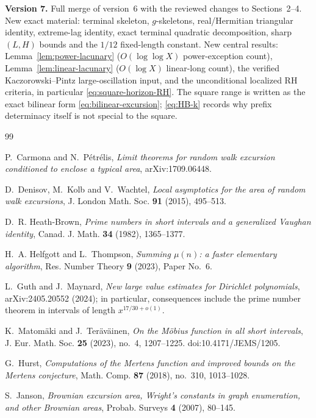\documentclass[11pt]{amsart}
\numberwithin{equation}{section}
\theoremstyle{plain}
\theoremstyle{definition}
\theoremstyle{remark}
\begin{document}
\medskip
\noindent\textbf{Version 7.} Full merge of version~6 with the reviewed
changes to Sections~2--4. New exact material: terminal skeleton,
$g$-skeletons, real/Hermitian triangular identity, extreme-lag identity,
exact terminal quadratic decomposition, sharp $(L,H)$ bounds and the $1/12$
fixed-length constant. New central results:
Lemma~\ref{lem:power-lacunary} ($O(\log\log X)$ power-exception count),
Lemma~\ref{lem:linear-lacunary} ($O(\log X)$ linear-long count), the verified
Kaczorowski--Pintz large-oscillation input, and the unconditional localized
RH criteria, in particular \eqref{eq:square-horizon-RH}. The square range is
written as the exact bilinear form \eqref{eq:bilinear-excursion};
\eqref{eq:HB-k} records why prefix determinacy itself is not special to the
square.

\begin{thebibliography}{99}


P.~Carmona and N.~P\'etr\'elis, \emph{Limit theorems for random walk excursion
conditioned to enclose a typical area}, arXiv:1709.06448.

D.~Denisov, M.~Kolb and V.~Wachtel, \emph{Local asymptotics for the area of
random walk excursions}, J. London Math. Soc. \textbf{91} (2015), 495--513.

D.~R. Heath-Brown, \emph{Prime numbers in short intervals and a generalized
Vaughan identity}, Canad. J. Math. \textbf{34} (1982), 1365--1377.

H.~A. Helfgott and L.~Thompson, \emph{Summing $\mu(n)$: a faster elementary
algorithm}, Res. Number Theory \textbf{9} (2023), Paper No.~6.

L.~Guth and J.~Maynard, \emph{New large value estimates for Dirichlet
polynomials}, arXiv:2405.20552 (2024); in particular, consequences include
the prime number theorem in intervals of length $x^{17/30+o(1)}$.

K.~Matom\"aki and J.~Ter\"av\"ainen, \emph{On the M\"obius function in
all short intervals}, J. Eur. Math. Soc. \textbf{25} (2023), no.~4,
1207--1225. doi:10.4171/JEMS/1205.

G.~Hurst, \emph{Computations of the Mertens function and improved bounds on
the Mertens conjecture}, Math. Comp. \textbf{87} (2018), no.~310, 1013--1028.

S.~Janson, \emph{Brownian excursion area, Wright's constants in graph
enumeration, and other Brownian areas}, Probab. Surveys \textbf{4} (2007),
80--145.


\end{thebibliography}
\end{document}
